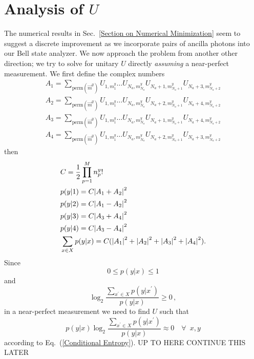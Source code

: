 \documentclass[aps,pra,twocolumn,showpacs,superscriptaddress,floatfix,10pt]{revtex4}
\begin{document}
\section{Analysis of $U$}
\label{Section on U Analysis}
The numerical results in Sec.~\ref{Section on Numerical Minimization} seem to suggest a discrete improvement as we incorporate pairs of ancilla photons into our Bell state analyzer. We now approach the problem from another other direction; we try to solve for unitary $U$ directly \textit{assuming} a near-perfect measurement.
We first define the complex numbers
\begin{eqnarray}
	 A_1 = \sum\limits_{\textrm{perm}(\vec{m}^y)} U_{1,m^y_1} \dots U_{N_a,m^y_{N_a}} U_{N_a+1,m^y_{N_a+1}} U_{N_a+3,m^y_{N_a+2}} \nonumber\\
	 A_2 = \sum\limits_{\textrm{perm}(\vec{m}^y)} U_{1,m^y_1} \dots U_{N_a,m^y_{N_a}} U_{N_a+2,m^y_{N_a+1}} U_{N_a+4,m^y_{N_a+2}} \nonumber\\
	 A_3 = \sum\limits_{\textrm{perm}(\vec{m}^y)} U_{1,m^y_1} \dots U_{N_a,m^y_{N_a}} U_{N_a+1,m^y_{N_a+1}} U_{N_a+4,m^y_{N_a+2}} \nonumber\\
	 A_4 = \sum\limits_{\textrm{perm}(\vec{m}^y)} U_{1,m^y_1} \dots U_{N_a,m^y_{N_a}} U_{N_a+2,m^y_{N_a+1}} U_{N_a+3,m^y_{N_a+2}} \nonumber
\end{eqnarray}
then
\begin{eqnarray}
	& C = \frac{1}{2}\prod_{p=1}^{M} n^y_p! \nonumber \\
	& p(y|1) = C \abs{A_1 + A_2}^2\nonumber \\
	& p(y|2) = C \abs{A_1 - A_2}^2 \\
	& p(y|3) = C \abs{A_3 + A_4}^2 \nonumber\\
	& p(y|4) = C \abs{A_3 - A_4}^2 \nonumber\\
	& \sum_{x \in X} p(y|x) = C(\abs{A_1}^2 + \abs{A_2}^2 + \abs{A_3}^2 + \abs{A_4}^2 ). \nonumber
\end{eqnarray}
Since 
\begin{equation}
	0 \le p(y|x) \le 1
\end{equation}
and
\begin{equation}
	\log_2 \frac{\sum_{x^\prime \in X} p(y|x^\prime)}{p(y|x)} \ge 0 \,,
\end{equation}
in a near-perfect measurement we need to find $U$ such that
\begin{equation}
	p(y|x) \log_2 \frac{\sum_{x^\prime \in X} p(y|x^\prime)}{p(y|x)} \approx 0 \quad \forall \enspace x,y
\end{equation}
according to Eq.~(\ref{Conditional Entropy}).
UP TO HERE CONTINUE THIS LATER
\end{document}

